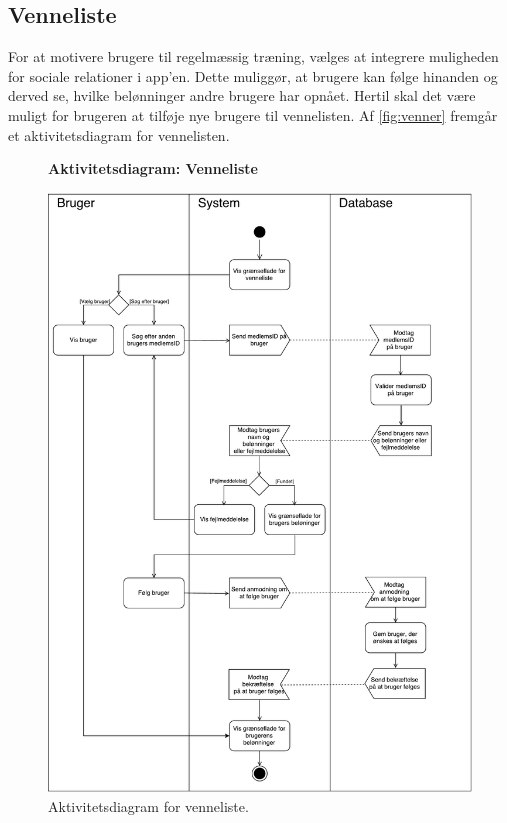 \subsection*{Venneliste} 
For at motivere brugere til regelmæssig træning, vælges at integrere muligheden for sociale relationer i app'en. Dette muliggør, at brugere kan følge hinanden og derved se, hvilke belønninger andre brugere har opnået. Hertil skal det være muligt for brugeren at tilføje nye brugere til vennelisten. 
Af \autoref{fig:venner} fremgår et aktivitetsdiagram for vennelisten.

\begin{figure} [H]
\centering
\textbf{Aktivitetsdiagram: Venneliste}\par\medskip
\includegraphics[width=1\textwidth]{figures/aktivitetsdiagram/venner}
\caption{Aktivitetsdiagram for venneliste.}
\label{fig:venner}
\end{figure}

